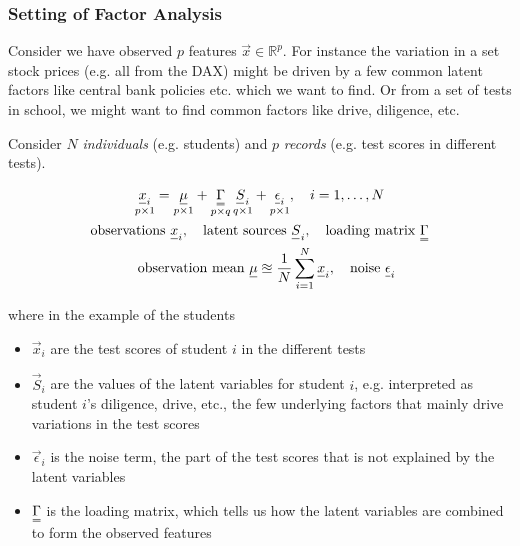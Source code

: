 \subsubsection{Setting of Factor Analysis}
Consider we have observed $p$ features $\vec{x} \in \mathbb{R}^{p}$.
For instance the variation in a set stock prices (e.g. all from the DAX) might be driven by a few common latent factors
like central bank policies etc. which we want to find. Or from a set of tests in school, we might want
to find common factors like drive, diligence, etc.

Consider $N$ \textit{individuals} (e.g. students) and $p$ \textit{records} (e.g. test scores in different tests).

\begin{equation}
    \begin{gathered}
        \underset{p\times 1}{\vec{x}_i} = \underset{p \times 1}{\vec{\mu}} + \underset{p \times q}{\mat{\Gamma}} \, \underset{q \times 1}{\vec{S}_i} + \underset{p \times 1}{\vec{\epsilon}_i}, \quad i = 1,\dots,N \\
        \text{observations } \vec{x}_i, \quad \text{latent sources } \vec{S}_i, \quad \text{loading matrix } \mat{\Gamma}\\
        \quad \text{observation mean } \vec{\mu} \approxeq \frac{1}{N} \sum_{i=1}^{N} \vec{x}_i, \quad \text{noise } \vec{\epsilon}_i
    \end{gathered}
\end{equation}

where in the example of the students
\begin{itemize}
    \item $\vec{x}_i$ are the test scores of student $i$ in the different tests
    \item $\vec{S}_i$ are the values of the latent variables for student $i$, e.g. interpreted as
    student $i$'s diligence, drive, etc., the few underlying factors that mainly drive variations in the test scores
    \item $\vec{\epsilon}_i$ is the noise term, the part of the test scores that is not explained by the latent variables
    \item $\mat{\Gamma}$ is the loading matrix, which tells us how the latent variables are combined to form the observed features
\end{itemize}

